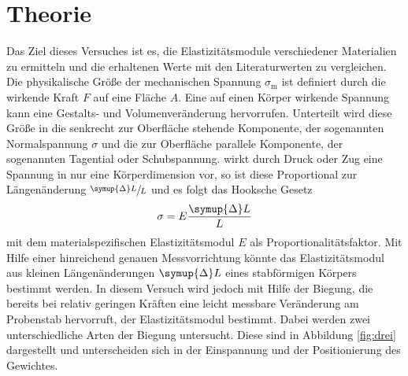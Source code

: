 \section{Theorie}
\label{sec:Theorie}
Das Ziel dieses Versuches ist es, die Elastizitätsmodule verschiedener Materialien zu ermitteln und die erhaltenen Werte mit den Literaturwerten zu vergleichen.
\\
Die physikalische Größe der mechanischen Spannung $\sigma_\text{m}$ ist definiert durch die wirkende Kraft $F$ auf eine Fläche $A$.
Eine auf einen Körper wirkende Spannung kann eine Gestalts- und Volumenveränderung hervorrufen.
Unterteilt wird diese Größe in die senkrecht zur Oberfläche stehende Komponente, der sogenannten Normalspannung $\sigma$ und die zur Oberfläche parallele Komponente, der sogenannten Tagential oder Schubspannung.
wirkt durch Druck oder Zug eine Spannung in nur eine Körperdimension vor, so ist diese Proportional zur Längenänderung $\sfrac{\symup{\Delta}L}{L}$ und es folgt das Hooksche Gesetz
\begin{equation}
    \sigma=E \frac{\symup{\Delta}L}{L}
\end{equation}
mit dem materialspezifischen Elastizitätsmodul $E$ als Proportionalitätsfaktor. 
Mit Hilfe einer hinreichend genauen Messvorrichtung könnte das Elastizitätsmodul aus kleinen Längenänderungen $\symup{\Delta}L$ eines stabförmigen Körpers bestimmt werden.
In diesem Versuch wird jedoch mit Hilfe der Biegung, die bereits bei relativ geringen Kräften eine leicht messbare Veränderung am Probenstab hervorruft, der Elastizitätsmodul bestimmt.
Dabei werden zwei unterschiedliche Arten der Biegung untersucht. Diese sind in Abbildung \ref{fig:drei} dargestellt und unterscheiden sich in der Einspannung und der Positionierung des Gewichtes.
